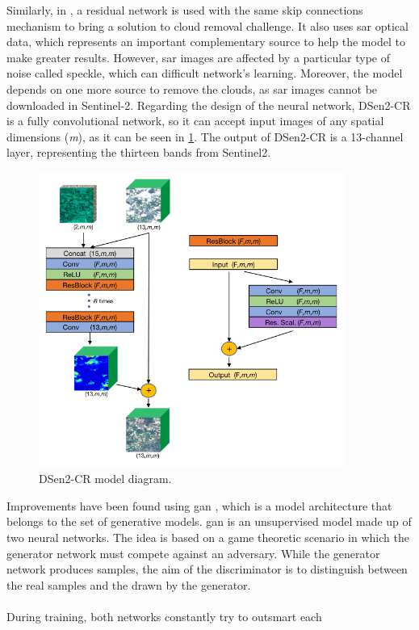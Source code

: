 \documentclass[11pt, a4paper]{article}
\begin{document}
	Similarly, in \cite{Meraner2020}, a residual network is used with the same skip connections mechanism to bring a solution to cloud removal challenge. It also uses
	\gls{sar} 
	optical data, which represents an important complementary source to help the model to make greater results. However, \gls{sar} images are affected by a particular type of noise called speckle, which can difficult network's learning. Moreover, the model depends on one more source to remove the clouds, as \gls{sar} images cannot be downloaded in Sentinel-2. Regarding the design of the neural network, 
	DSen2-CR is a fully convolutional network, so it can accept input images of any spatial dimensions (\textit{m}), as it can be seen in \ref{fig:dsen2-cr}.
	The  output of DSen2-CR is a 13-channel layer, representing the thirteen bands from Sentinel2.  
	\begin{figure}[H]
		\centering
		\includegraphics[width=10cm]{imgs/relatedwork/sar.png}
		\caption{DSen2-CR model diagram.}
		\label{fig:dsen2-cr}
	\end{figure}
	Improvements have been found using \gls{gan} \cite{goodfellow2014generative}, which is a model architecture that belongs to the set of generative models. \gls{gan} is an unsupervised model made up of two neural networks. The idea is based on a game theoretic scenario in which the generator network must compete against an adversary. While the generator network produces samples, the aim of the discriminator is to distinguish between the real samples and the drawn by the generator. 
	\\
	\\
	During training, both networks constantly try to outsmart each
\end{document}
